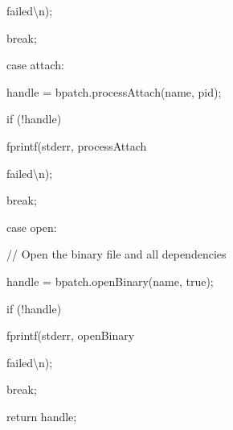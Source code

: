 {{{{{failed{\textbackslash}n{\textquotedbl}); }}



{

break;}



{

case attach:}



{

handle = bpatch.processAttach(name, pid);}



{

if (!handle) { fprintf(stderr, {\textquotedbl}processAttach

failed{\textbackslash}n{\textquotedbl}); }}



{

break;}



{

case open:}



{

// Open the binary file and all dependencies}



{

handle = bpatch.openBinary(name, true);}



{

if (!handle) { fprintf(stderr, {\textquotedbl}openBinary

failed{\textbackslash}n{\textquotedbl}); }}



{

break;}



{

}}





\bigskip



{

return handle;}



{

}}





\bigskip





\bigskip





}
